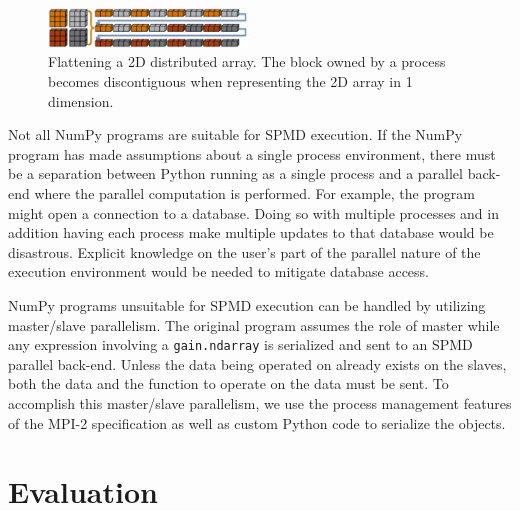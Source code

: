 \documentclass[preprint]{sigplanconf}
\begin{document}
\begin{figure}[htb]
\centering
\includegraphics[width=0.47\textwidth]{image6_crop.eps}
\caption{
Flattening a 2D distributed array. The block owned by a process becomes
discontiguous when representing the 2D array in 1 dimension.
}
\label{fig:flatten}
\end{figure}

Not all NumPy programs are suitable for SPMD execution. If the NumPy program
has made assumptions about a single process environment, there must be a
separation between Python running as a single process and a parallel back-end
where the parallel computation is performed. For example, the program might
open a connection to a database. Doing so with multiple processes and in
addition having each process make multiple updates to that database would be
disastrous. Explicit knowledge on the user’s part of the parallel nature of
the execution environment would be needed to mitigate database access.

NumPy programs unsuitable for SPMD execution can be handled by utilizing
master/slave parallelism. The original program assumes the role of master
while any expression involving a \texttt{gain.ndarray} is serialized and sent
to an SPMD parallel back-end. Unless the data being operated on already exists
on the slaves, both the data and the function to operate on the data must be
sent. To accomplish this master/slave parallelism, we use the process
management features of the MPI-2 specification as well as custom Python code
to serialize the objects.

\section{Evaluation}
\end{document}
